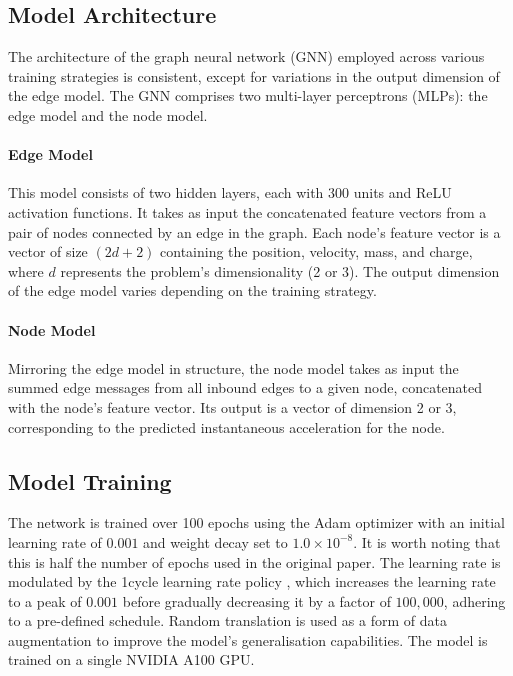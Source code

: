 \documentclass[11pt]{article}
\begin{document}
\subsection{Model Architecture}
The architecture of the graph neural network (GNN) employed across various training strategies is consistent, except for variations in the output dimension of the edge model. The GNN comprises two multi-layer perceptrons (MLPs): the edge model and the node model.

\paragraph*{Edge Model} This model consists of two hidden layers, each with 300 units and ReLU activation functions. It takes as input the concatenated feature vectors from a pair of nodes connected by an edge in the graph. Each node's feature vector is a vector of size $(2d+2)$ containing the position, velocity, mass, and charge, where $d$ represents the problem's dimensionality (2 or 3). The output dimension of the edge model varies depending on the training strategy.

\paragraph*{Node Model} Mirroring the edge model in structure, the node model takes as input the summed edge messages from all inbound edges to a given node, concatenated with the node's feature vector. Its output is a vector of dimension 2 or 3, corresponding to the predicted instantaneous acceleration for the node.

\subsection{Model Training}
The network is trained over 100 epochs using the Adam optimizer with an initial learning rate of \(0.001\) and weight decay set to \(1.0 \times 10^{-8}\). It is worth noting that this is half the number of epochs used in the original paper. The learning rate is modulated by the 1cycle learning rate policy \cite{smith2018superconvergence}, which increases the learning rate to a peak of \(0.001\) before gradually decreasing it by a factor of \(100,000\), adhering to a pre-defined schedule. Random translation is used as a form of data augmentation to improve the model's generalisation capabilities. The model is trained on a single NVIDIA A100 GPU.
\end{document}
